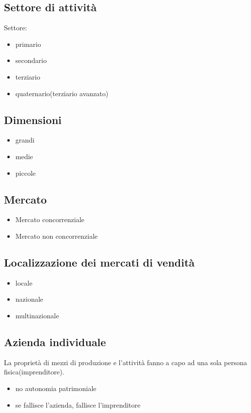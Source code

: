\subsection{Settore di attività}
Settore:
\begin{itemize}
    \item primario
    \item secondario
    \item terziario
    \item quaternario(terziario avanzato)
\end{itemize}
\subsection{Dimensioni}
\begin{itemize}
    \item grandi
    \item medie
    \item piccole
\end{itemize}
\subsection{Mercato}
\begin{itemize}
    \item Mercato concorrenziale
    \item Mercato non concorrenziale
\end{itemize}
\subsection{Localizzazione dei mercati di vendità}


\begin{itemize}
    \item locale
    \item nazionale
    \item multinazionale
\end{itemize}

\subsection{Azienda individuale}
La proprietà di mezzi di produzione e l'attività fanno a capo ad 
una sola persona fisica(imprenditore).

\begin{itemize}
    \item no autonomia patrimoniale
    \item se fallisce l'azienda, fallisce l'imprenditore
\end{itemize}

